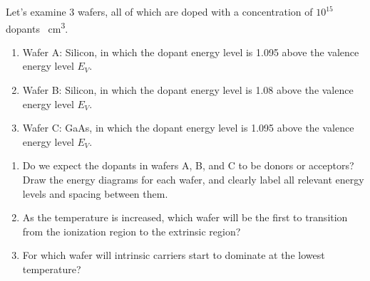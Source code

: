 \documentclass[fleqn, a4paper, 11pt, oneside]{amsart}
\theoremstyle{definition}
\theoremstyle{theorem}
\begin{document}
\begin{question}
	Let's examine 3 wafers, all of which are doped with a concentration of $10^{15}$ dopants \si{\per\cubic\centi\metre}.
	\begin{enumerate}
		\item Wafer A: Silicon, in which the dopant energy level is 1.095 \electronvolt above the valence energy level $E_V$.
		\item Wafer B: Silicon, in which the dopant energy level is 1.08 \electronvolt above the valence energy level $E_V$.
		\item Wafer C: GaAs, in which the dopant energy level is 1.095 \electronvolt above the valence energy level $E_V$.
	\end{enumerate}
	\begin{enumerate}
		\item
			Do we expect the dopants in wafers A, B, and C to be donors or acceptors?
			Draw the energy diagrams for each wafer, and clearly label all relevant energy levels and spacing between them.
		\item
			As the temperature is increased, which wafer will be the first to transition from the ionization region to the extrinsic region?
		\item
			For which wafer will intrinsic carriers start to dominate at the lowest temperature?
	\end{enumerate}
\end{question}
\end{document}
